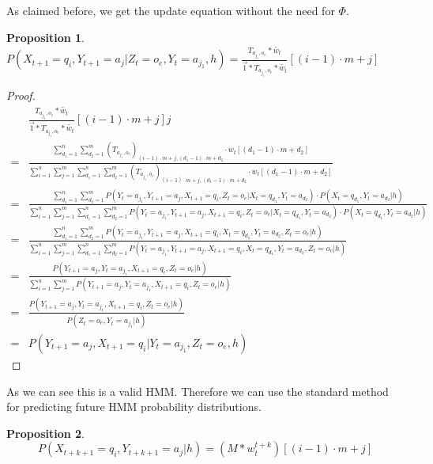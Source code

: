 \documentclass{article}
\newtheorem{prop}{Proposition}
\theoremstyle{definition}
\begin{document}
As claimed before, we get the update equation without the need for $\Phi$. 
\begin{prop}
$P(X_{t+1}=q_i,Y_{t+1}=a_j|Z_t=o_e,Y_t=a_{j_1},h)=\frac{T_{a_{j_1},o_e}*\widetilde{w_t}}{\vec{1}*T_{a_{j_1},o_e}*\widetilde{w_t}}[(i-1)\cdot m+j]$ 
\end{prop}
\begin{proof}
\begin{align*}
&\frac{T_{a_{j_1},o_e}*\widetilde{w_t}}{\vec{1}*T_{a_{j_1},o_e}*\widetilde{w_t}}[(i-1)\cdot
  m+j]j\\
=&\frac{\sum\limits_{d_1=1}^{n} \sum\limits_{d_2=1}^m (T_{a_{j_1},o_e})_{(i-1)\cdot m+j,(d_1-1)\cdot m+d_2}\cdot w_t[(d_1-1)\cdot m+ d_2]}{\sum\limits_{i=1}^n \sum\limits_{j=1}^m \sum\limits_{d_1=1}^{n} \sum\limits_{d_2=1}^m (T_{a_{j_1},o_e})_{(i-1)\cdot m+j,(d_1-1)\cdot m+d_2}\cdot w_t[(d_1-1)\cdot m+ d_2]} \\
=&\frac{\sum\limits_{d_1=1}^{n} \sum\limits_{d_2=1}^m P(Y_t=a_{j_1},Y_{t+1}=a_j,X_{t+1}=q_i,Z_t=o_e|X_t=q_{d_1},Y_t=a_{d_2}) \cdot P(X_t=q_{d_1},Y_t=a_{d_2}|h)}{\sum\limits_{i=1}^n \sum\limits_{j=1}^m\sum\limits_{d_1=1}^{n} \sum\limits_{d_2=1}^m P(Y_t=a_{j_1},Y_{t+1}=a_j,X_{t+1}=q_i,Z_t=o_e|X_t=q_{d_1},Y_t=a_{d_2}) \cdot P(X_t=q_{d_1},Y_t=a_{d_2}|h)} \\
=&\frac{\sum\limits_{d_1=1}^n \sum\limits_{d_2=1}^m P(Y_t=a_{j_1},Y_{t+1}=a_j,X_{t+1}=q_i,X_t=q_{d_1},Y_t=a_{d_2},Z_t=o_e|h) }{\sum\limits_{i=1}^n \sum\limits_{j=1}^m \sum\limits_{d_1=1}^n \sum\limits_{d_2=1}^m P(Y_t=a_{j_1},Y_{t+1}=a_j,X_{t+1}=q_i,X_t=q_{d_1},Y_t=a_{d_2},Z_t=o_e|h)} \\
=&\frac{P(Y_{t+1}=a_j,Y_t=a_{j_1},X_{t+1}=q_i,Z_t=o_e|h)}{\sum\limits_{i=1}^{n} \sum\limits_{j=1}^m P(Y_{t+1}=a_j,Y_t=a_{j_1},X_{t+1}=q_i,Z_t=o_e|h)}\\ 
=&\frac{P(Y_{t+1}=a_j,Y_t=a_{j_1},X_{t+1}=q_i,Z_t=o_e|h)}{P(Z_t=o_e,Y_t=a_{j_1}|h)} \\ 
=& P(Y_{t+1}=a_j,X_{t+1}=q_i|Y_t=a_{j_1},Z_t=o_e,h)
\end{align*}
\end{proof}
As we can see this is a valid HMM. Therefore we can use the standard method for predicting future HMM probability distributions. 
\begin{prop}
\[P(X_{t+k+1}=q_i,Y_{t+k+1}=a_j|h)=(M*w_{t}^{t+k})[(i-1)\cdot m+j]\]
\end{prop}
\end{document}
